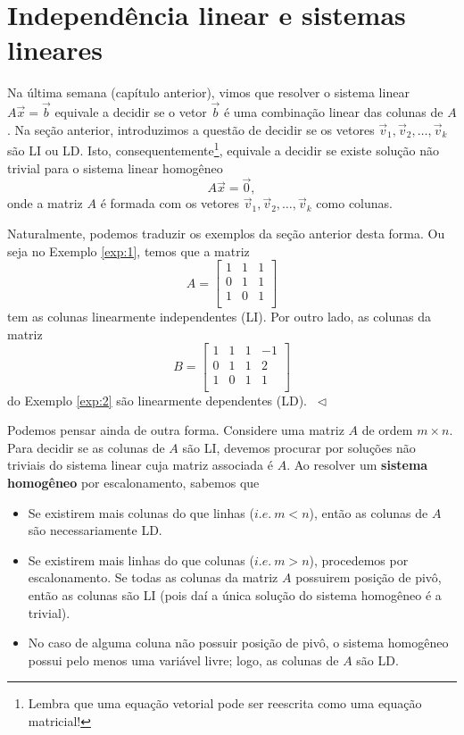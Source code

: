 \documentclass[../livro.tex]{subfiles}
\begin{document}
\section{Independência linear e sistemas lineares}

Na última semana (capítulo anterior), vimos que resolver o sistema linear $A \vec{x} = \vec{b}$ equivale a decidir se o vetor $\vec{b}$ é uma combinação linear das colunas de $A$. Na seção anterior, introduzimos a questão de decidir se os vetores $\vec{v}_1, \vec{v}_2, \dots, \vec{v}_k$ são LI ou LD. Isto, consequentemente\footnote{Lembra que uma equação vetorial pode ser reescrita como uma equação matricial!}, equivale a decidir se existe solução não trivial para o sistema linear homogêneo
\begin{equation}
A \vec{x} = \vec{0},
\end{equation} onde a matriz $A$ é formada com os vetores $\vec{v}_1, \vec{v}_2, \dots, \vec{v}_k$ como colunas.

\begin{example}
Naturalmente, podemos traduzir os exemplos da seção anterior desta forma. Ou seja no Exemplo \ref{exp:1}, temos que a matriz
\begin{equation}
A = \left[
  \begin{array}{ccc}
    1 & 1 & 1  \\
    0 & 1 & 1   \\
    1 & 0 & 1  \\
  \end{array}
\right]
\end{equation} tem as colunas linearmente independentes (LI). Por outro lado, as colunas da matriz
\begin{equation}
B = \left[
  \begin{array}{cccc}
    1 & 1 & 1 & -1 \\
    0 & 1 & 1 & 2  \\
    1 & 0 & 1 & 1  \\
  \end{array}
\right]
\end{equation} do Exemplo \ref{exp:2} são linearmente dependentes (LD). $\ \lhd$
\end{example}

Podemos pensar ainda de outra forma. Considere uma matriz $A$ de ordem $m\times n.$ Para decidir se as colunas de $A$ são LI, devemos procurar por soluções não triviais do sistema linear cuja matriz associada é $A$. Ao resolver um \textbf{sistema homogêneo} por escalonamento, sabemos que
\begin{itemize}
  \item Se existirem mais colunas do que linhas ($i.e. \ m<n$), então as colunas de $A$ são necessariamente LD.
  \item Se existirem mais linhas do que colunas ($i.e. \ m>n$), procedemos por escalonamento. Se todas as colunas da matriz $A$ possuirem posição de pivô, então as colunas são LI (pois daí a única solução do sistema homogêneo é a trivial). 
  \item No caso de alguma coluna não possuir posição de pivô, o sistema homogêneo possui pelo menos uma variável livre; logo, as colunas de $A$ são LD.
\end{itemize}
\end{document}

